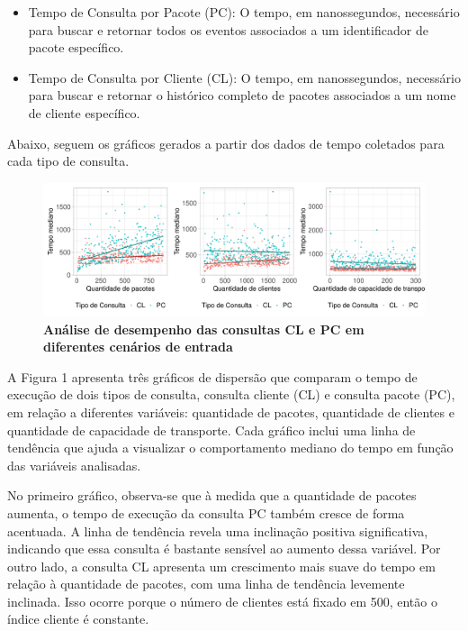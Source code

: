 \documentclass[
  12pt,
]{article}
\begin{document}
\begin{itemize}
\item
  Tempo de Consulta por Pacote (PC): O tempo, em nanossegundos,
  necessário para buscar e retornar todos os eventos associados a um
  identificador de pacote específico.
\item
  Tempo de Consulta por Cliente (CL): O tempo, em nanossegundos,
  necessário para buscar e retornar o histórico completo de pacotes
  associados a um nome de cliente específico.
\end{itemize}

Abaixo, seguem os gráficos gerados a partir dos dados de tempo coletados
para cada tipo de consulta.

\begin{figure}[H]

{\centering \includegraphics{Relatorio_files/figure-latex/grafico rearmazenado-1} 

}

\caption{\textbf{Análise de desempenho das consultas CL e PC em diferentes cenários de entrada}}\label{fig:grafico rearmazenado}
\end{figure}

A Figura 1 apresenta três gráficos de dispersão que comparam o tempo de
execução de dois tipos de consulta, consulta cliente (CL) e consulta
pacote (PC), em relação a diferentes variáveis: quantidade de pacotes,
quantidade de clientes e quantidade de capacidade de transporte. Cada
gráfico inclui uma linha de tendência que ajuda a visualizar o
comportamento mediano do tempo em função das variáveis analisadas.

No primeiro gráfico, observa-se que à medida que a quantidade de pacotes
aumenta, o tempo de execução da consulta PC também cresce de forma
acentuada. A linha de tendência revela uma inclinação positiva
significativa, indicando que essa consulta é bastante sensível ao
aumento dessa variável. Por outro lado, a consulta CL apresenta um
crescimento mais suave do tempo em relação à quantidade de pacotes, com
uma linha de tendência levemente inclinada. Isso ocorre porque o número
de clientes está fixado em 500, então o índice cliente é constante.
\end{document}
